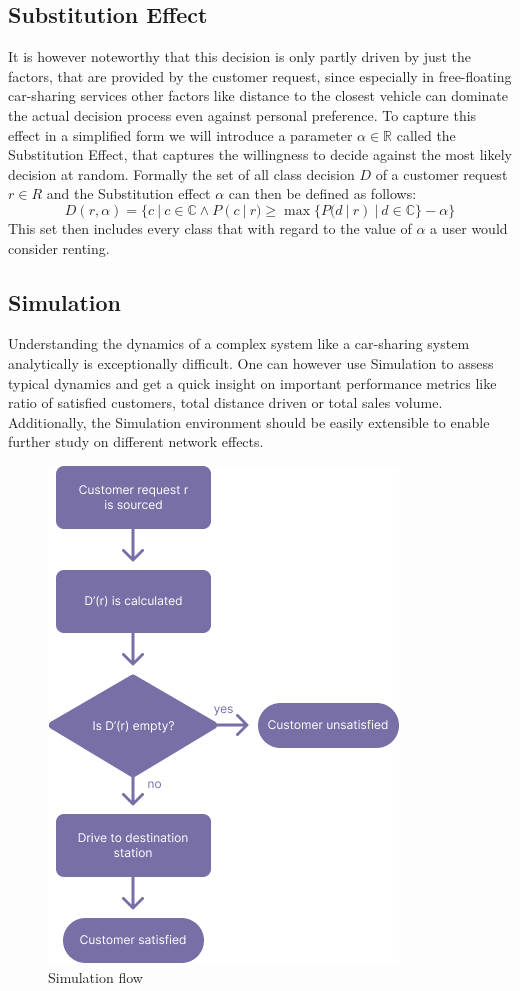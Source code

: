 \subsection{Substitution Effect}
\label{sub_sec:Method/Substitution}

It is however noteworthy that this decision is only
partly driven by just the factors, that are provided by the customer request, since especially in free-floating car-sharing services
other factors like distance to the closest vehicle can dominate the actual decision process even against personal
preference. To capture this effect in a simplified form we will introduce a parameter $\alpha \in \mathbb{R}$
called the Substitution Effect, that captures the willingness to decide against the most likely
decision at random. Formally the set of all class decision $D$ of a customer request $r \in R$ and the 
Substitution effect $\alpha$ can then be defined as follows:
$$
  D(r, \alpha) = \{ c \ | \ c \in \mathbb{C} \land P(c \ | \ r) \ge \max\{ P(d \ | \ r) \ | \ d \in \mathbb{C} \} - \alpha \}
$$
This set then includes every class that with regard to the value of $\alpha$ a user would consider renting.

\subsection{Simulation}
\label{sub_sec:Method/Simulation}

Understanding the dynamics of a complex system like a car-sharing system analytically is exceptionally difficult.
One can however use Simulation to assess typical dynamics and get a quick insight on important performance metrics
like ratio of satisfied customers, total distance driven or total sales volume. Additionally, the Simulation
environment should be easily extensible to enable further study on different network effects. 

\begin{figure}[htbp]
  \centering
  \includegraphics[width=.5\linewidth]{./Figures/event-flow.png}
  \caption{Simulation flow}
  \label{fig:Flow}
\end{figure}

